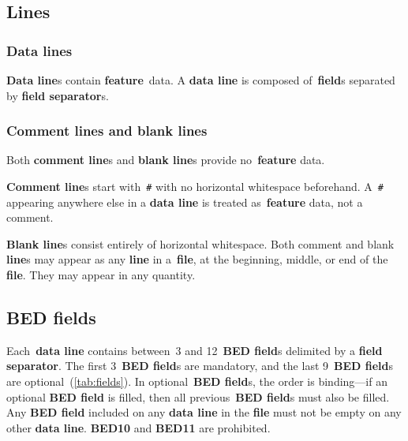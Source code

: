 \documentclass[11pt]{article}
\begin{document}
\subsection{Lines}\label{sec:lines}

\subsubsection{Data lines}

\textbf{Data line}s contain \textbf{feature}~data.
A \textbf{data line} is composed of~\textbf{field}s separated by \textbf{field separator}s.

\subsubsection{Comment lines and blank lines}

Both \textbf{comment line}s and \textbf{blank line}s provide no~\textbf{feature} data.

\textbf{Comment line}s start with~\texttt{\#} with no horizontal whitespace beforehand.
A~\texttt{\#} appearing anywhere else in a \textbf{data line} is treated as~\textbf{feature} data, not a comment.

\textbf{Blank line}s consist entirely of horizontal whitespace.
Both comment and blank \textbf{line}s may appear as any \textbf{line} in a~\textbf{file}, at the beginning, middle, or end of the \textbf{file}.
They may appear in any quantity.

\subsection{\acs{BED} fields}

Each~\textbf{data line} contains between~3 and 12~\textbf{\acs{BED} field}s delimited by a \textbf{field separator}.
The first 3~\textbf{\acs{BED} field}s are mandatory, and the last 9~\textbf{\acs{BED} field}s are optional~(\autoref{tab:fields}).
In optional~\textbf{\acs{BED} field}s, the order is binding---if an optional \textbf{\acs{BED} field} is filled, then all previous~\textbf{\acs{BED} field}s must also be filled.
Any \textbf{\acs{BED} field} included on any \textbf{data line} in the \textbf{file} must not be empty on any other \textbf{data line}.
\textbf{BED10} and \textbf{BED11} are prohibited.
\end{document}
